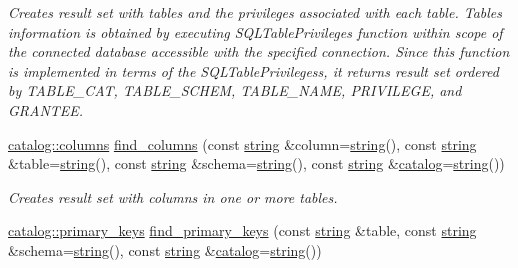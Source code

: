 \begin{DoxyCompactItemize}
\begin{DoxyCompactList}\small\item\em Creates result set with tables and the privileges associated with each table. Tables information is obtained by executing {\ttfamily S\+Q\+L\+Table\+Privileges} function within scope of the connected database accessible with the specified connection. Since this function is implemented in terms of the {\ttfamily S\+Q\+L\+Table\+Privileges}s, it returns result set ordered by T\+A\+B\+L\+E\+\_\+\+C\+AT, T\+A\+B\+L\+E\+\_\+\+S\+C\+H\+EM, T\+A\+B\+L\+E\+\_\+\+N\+A\+ME, P\+R\+I\+V\+I\+L\+E\+GE, and G\+R\+A\+N\+T\+EE. \end{DoxyCompactList}\item 
\mbox{\hyperlink{classnanodbc_1_1catalog_1_1columns}{catalog\+::columns}} \mbox{\hyperlink{classnanodbc_1_1catalog_ae095ba2ea1953355c7bdfba3b9e99cfa}{find\+\_\+columns}} (const \mbox{\hyperlink{namespacenanodbc_abfc0ece56278e590911ec8352774c212}{string}} \&column=\mbox{\hyperlink{namespacenanodbc_abfc0ece56278e590911ec8352774c212}{string}}(), const \mbox{\hyperlink{namespacenanodbc_abfc0ece56278e590911ec8352774c212}{string}} \&table=\mbox{\hyperlink{namespacenanodbc_abfc0ece56278e590911ec8352774c212}{string}}(), const \mbox{\hyperlink{namespacenanodbc_abfc0ece56278e590911ec8352774c212}{string}} \&schema=\mbox{\hyperlink{namespacenanodbc_abfc0ece56278e590911ec8352774c212}{string}}(), const \mbox{\hyperlink{namespacenanodbc_abfc0ece56278e590911ec8352774c212}{string}} \&\mbox{\hyperlink{classnanodbc_1_1catalog}{catalog}}=\mbox{\hyperlink{namespacenanodbc_abfc0ece56278e590911ec8352774c212}{string}}())
\begin{DoxyCompactList}\small\item\em Creates result set with columns in one or more tables. \end{DoxyCompactList}\item 
\mbox{\hyperlink{classnanodbc_1_1catalog_1_1primary__keys}{catalog\+::primary\+\_\+keys}} \mbox{\hyperlink{classnanodbc_1_1catalog_a611a69c39c361e1902df3bf9a793a638}{find\+\_\+primary\+\_\+keys}} (const \mbox{\hyperlink{namespacenanodbc_abfc0ece56278e590911ec8352774c212}{string}} \&table, const \mbox{\hyperlink{namespacenanodbc_abfc0ece56278e590911ec8352774c212}{string}} \&schema=\mbox{\hyperlink{namespacenanodbc_abfc0ece56278e590911ec8352774c212}{string}}(), const \mbox{\hyperlink{namespacenanodbc_abfc0ece56278e590911ec8352774c212}{string}} \&\mbox{\hyperlink{classnanodbc_1_1catalog}{catalog}}=\mbox{\hyperlink{namespacenanodbc_abfc0ece56278e590911ec8352774c212}{string}}())

\end{DoxyCompactItemize}
